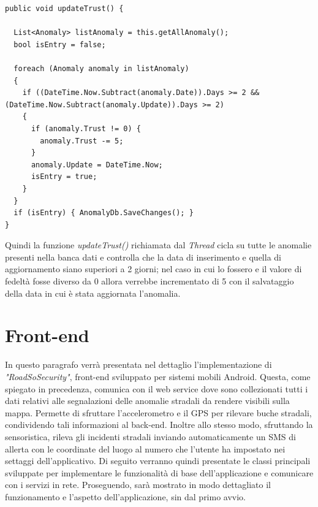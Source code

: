 \documentclass[a4paper, 11pt]{article} %
\begin{document}
\begin{lstlisting}
public void updateTrust() {

  List<Anomaly> listAnomaly = this.getAllAnomaly();
  bool isEntry = false;

  foreach (Anomaly anomaly in listAnomaly)
  {
    if ((DateTime.Now.Subtract(anomaly.Date)).Days >= 2 && (DateTime.Now.Subtract(anomaly.Update)).Days >= 2)
    {
      if (anomaly.Trust != 0) { 
        anomaly.Trust -= 5; 
      }
      anomaly.Update = DateTime.Now;
      isEntry = true;
    }
  }
  if (isEntry) { AnomalyDb.SaveChanges(); }
}
\end{lstlisting}
Quindi la funzione \textit{updateTrust()} richiamata dal \textit{Thread} cicla su tutte le anomalie presenti nella banca dati e controlla che la data di inserimento e quella di aggiornamento siano superiori a 2 giorni; nel caso in cui lo fossero e il valore di fedeltà fosse diverso da 0 allora verrebbe incrementato di 5 con il salvataggio della data in cui è stata aggiornata l'anomalia.

\section{Front-end}
In questo paragrafo verrà presentata nel dettaglio l’implementazione di \textit{"RoadSoSecurity"}, front-end sviluppato per sistemi mobili Android. Questa, come spiegato in precedenza, comunica con il web service dove sono collezionati tutti i dati relativi alle segnalazioni delle anomalie stradali da rendere visibili sulla mappa. Permette di sfruttare l'accelerometro e il GPS per rilevare buche stradali, condividendo tali informazioni al back-end. Inoltre allo stesso modo, sfruttando la sensoristica, rileva gli incidenti stradali inviando automaticamente un SMS di allerta con le coordinate del luogo al numero che l'utente ha impostato nei settaggi dell'applicativo. Di seguito verranno quindi presentate le classi principali sviluppate per implementare le funzionalità di base dell’applicazione e comunicare con i servizi in rete. Proseguendo, sarà mostrato in modo dettagliato il funzionamento e l’aspetto dell’applicazione, sin dal primo avvio.
\end{document}
